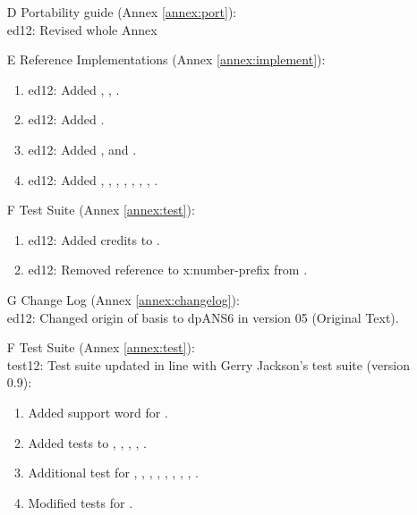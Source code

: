 \begin{itemize}
	\item[D] Portability guide (Annex \ref{annex:port}):			%
		\\ \textsf{ed12}: Revised whole Annex

	\item[E] Reference Implementations (Annex \ref{annex:implement}):	%
		\begin{enumerate}
		\item \textsf{ed12}: Added , , .
		\item \textsf{ed12}: Added .
		\item \textsf{ed12}: Added ,  and .
		\item \textsf{ed12}: Added
			,
			,
			,
			,
			,
			,
			,
			.
		\end{enumerate}
	\item[F] Test Suite (Annex \ref{annex:test}):					%
		\begin{enumerate}
		\item \textsf{ed12}: Added credits to .
		\item \textsf{ed12}: Removed reference to \textsf{x:number-prefix}
			from .
		\end{enumerate}

	\item[G] Change Log (Annex \ref{annex:changelog}): \\
		\textsf{ed12}: Changed origin of basis to dpANS6 in
			version 05 (Original Text).

	\end{itemize}


	\begin{itemize}
	\item[F] Test Suite (Annex \ref{annex:test}): \\
		\textsf{test12}: Test suite updated in line with Gerry Jackson's test suite (version 0.9):
		\begin{enumerate}
		\item Added support word for .
		\item Added tests to
			,
			,
			,
			,
			.
		\item Additional test for
			,
			,
			,
			,
			,
			,
			,
			,
			.
		\item Modified tests for
			.
		\end{enumerate}
	\end{itemize}


